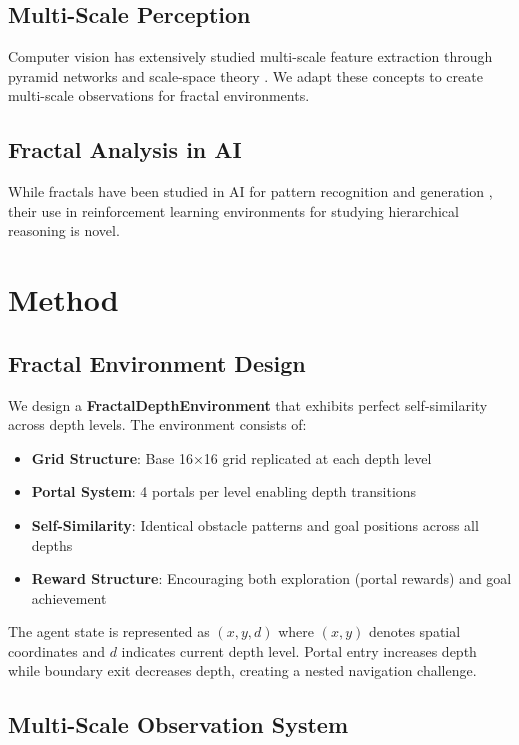 \documentclass[11pt]{article}
\begin{document}
\subsection{Multi-Scale Perception}
Computer vision has extensively studied multi-scale feature extraction through pyramid networks \cite{lin2017fpn} and scale-space theory \cite{lindeberg2013scale}. We adapt these concepts to create multi-scale observations for fractal environments.

\subsection{Fractal Analysis in AI}
While fractals have been studied in AI for pattern recognition \cite{pentland1984fractal} and generation \cite{mandelbrot1982fractal}, their use in reinforcement learning environments for studying hierarchical reasoning is novel.

\section{Method}

\subsection{Fractal Environment Design}

We design a \textbf{FractalDepthEnvironment} that exhibits perfect self-similarity across depth levels. The environment consists of:

\begin{itemize}
    \item \textbf{Grid Structure}: Base 16×16 grid replicated at each depth level
    \item \textbf{Portal System}: 4 portals per level enabling depth transitions
    \item \textbf{Self-Similarity}: Identical obstacle patterns and goal positions across all depths
    \item \textbf{Reward Structure}: Encouraging both exploration (portal rewards) and goal achievement
\end{itemize}

The agent state is represented as $(x, y, d)$ where $(x,y)$ denotes spatial coordinates and $d$ indicates current depth level. Portal entry increases depth while boundary exit decreases depth, creating a nested navigation challenge.

\subsection{Multi-Scale Observation System}
\end{document}
